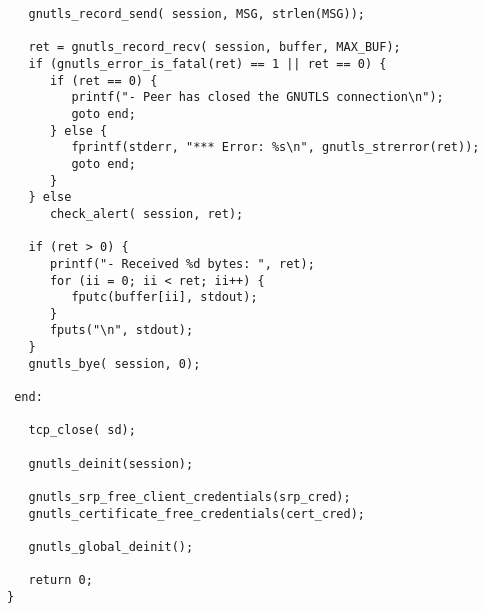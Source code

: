 \begin{verbatim}
   gnutls_record_send( session, MSG, strlen(MSG));

   ret = gnutls_record_recv( session, buffer, MAX_BUF);
   if (gnutls_error_is_fatal(ret) == 1 || ret == 0) {
      if (ret == 0) {
         printf("- Peer has closed the GNUTLS connection\n");
         goto end;
      } else {
         fprintf(stderr, "*** Error: %s\n", gnutls_strerror(ret));
         goto end;
      }
   } else
      check_alert( session, ret);

   if (ret > 0) {
      printf("- Received %d bytes: ", ret);
      for (ii = 0; ii < ret; ii++) {
         fputc(buffer[ii], stdout);
      }
      fputs("\n", stdout);
   }
   gnutls_bye( session, 0);

 end:

   tcp_close( sd);

   gnutls_deinit(session);

   gnutls_srp_free_client_credentials(srp_cred);
   gnutls_certificate_free_credentials(cert_cred);

   gnutls_global_deinit();

   return 0;
}

\end{verbatim}
